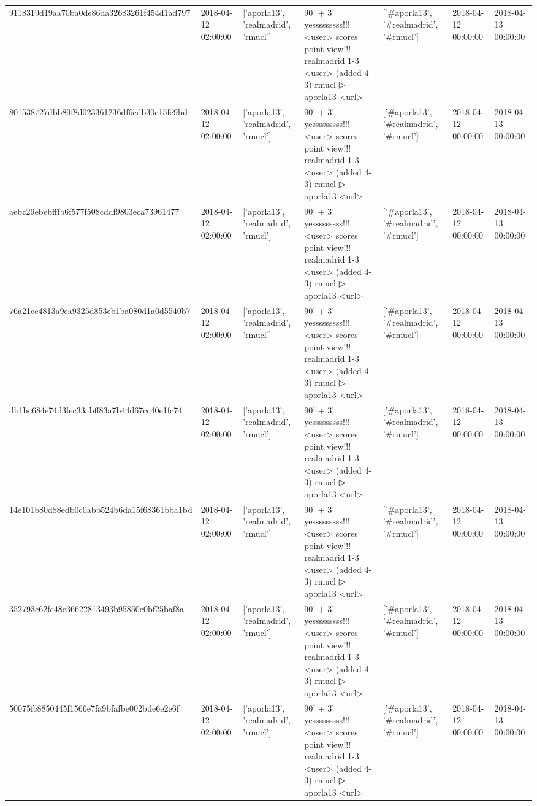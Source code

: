 \begin{tabular}{lllllll}
9118319d19aa70ba0de86da32683261f454d1ad797 & 2018-04-12 02:00:00 & ['aporla13', 'realmadrid', 'rmucl'] & 90' + 3' yesssssssss!!! <user> scores point view!!! realmadrid 1-3 <user> (added 4-3) rmucl ▷ aporla13 <url> & ['#aporla13', '#realmadrid', '#rmucl'] & 2018-04-12 00:00:00 & 2018-04-13 00:00:00 \\
801538727dbb89f8d023361236df6edb30c15fe9bd & 2018-04-12 02:00:00 & ['aporla13', 'realmadrid', 'rmucl'] & 90' + 3' yesssssssss!!! <user> scores point view!!! realmadrid 1-3 <user> (added 4-3) rmucl ▷ aporla13 <url> & ['#aporla13', '#realmadrid', '#rmucl'] & 2018-04-12 00:00:00 & 2018-04-13 00:00:00 \\
aebc29ebebfffb6f577f508cddf9803eca73961477 & 2018-04-12 02:00:00 & ['aporla13', 'realmadrid', 'rmucl'] & 90' + 3' yesssssssss!!! <user> scores point view!!! realmadrid 1-3 <user> (added 4-3) rmucl ▷ aporla13 <url> & ['#aporla13', '#realmadrid', '#rmucl'] & 2018-04-12 00:00:00 & 2018-04-13 00:00:00 \\
76a21ce4813a9ea9325d853eb1ba080d1a0d5540b7 & 2018-04-12 02:00:00 & ['aporla13', 'realmadrid', 'rmucl'] & 90' + 3' yesssssssss!!! <user> scores point view!!! realmadrid 1-3 <user> (added 4-3) rmucl ▷ aporla13 <url> & ['#aporla13', '#realmadrid', '#rmucl'] & 2018-04-12 00:00:00 & 2018-04-13 00:00:00 \\
db1bc684e74d3fec33abff83a7b44d67cc40e1fc74 & 2018-04-12 02:00:00 & ['aporla13', 'realmadrid', 'rmucl'] & 90' + 3' yesssssssss!!! <user> scores point view!!! realmadrid 1-3 <user> (added 4-3) rmucl ▷ aporla13 <url> & ['#aporla13', '#realmadrid', '#rmucl'] & 2018-04-12 00:00:00 & 2018-04-13 00:00:00 \\
14e101b80d88edb0c0abb524b6da15f68361bba1bd & 2018-04-12 02:00:00 & ['aporla13', 'realmadrid', 'rmucl'] & 90' + 3' yesssssssss!!! <user> scores point view!!! realmadrid 1-3 <user> (added 4-3) rmucl ▷ aporla13 <url> & ['#aporla13', '#realmadrid', '#rmucl'] & 2018-04-12 00:00:00 & 2018-04-13 00:00:00 \\
352793c62fc48e36622813493b95850e0bf25baf8a & 2018-04-12 02:00:00 & ['aporla13', 'realmadrid', 'rmucl'] & 90' + 3' yesssssssss!!! <user> scores point view!!! realmadrid 1-3 <user> (added 4-3) rmucl ▷ aporla13 <url> & ['#aporla13', '#realmadrid', '#rmucl'] & 2018-04-12 00:00:00 & 2018-04-13 00:00:00 \\
50075fc8850445f1566e7fa9bfafbe002bde6e2e6f & 2018-04-12 02:00:00 & ['aporla13', 'realmadrid', 'rmucl'] & 90' + 3' yesssssssss!!! <user> scores point view!!! realmadrid 1-3 <user> (added 4-3) rmucl ▷ aporla13 <url> & ['#aporla13', '#realmadrid', '#rmucl'] & 2018-04-12 00:00:00 & 2018-04-13 00:00:00 \\

\end{tabular}
